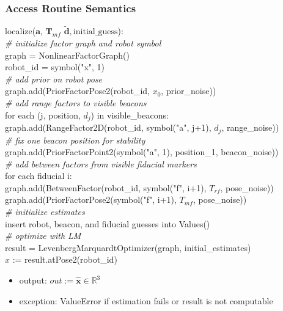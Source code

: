 \documentclass[12pt, titlepage]{article}
\begin{document}
\subsubsection{Access Routine Semantics}

\noindent localize($\mathbf{a}$, $\mathbf{T}_{mf}$ $\mathbf{\tilde{d}}, \mathrm{initial\_guess}$):\\

\noindent \textit{\# initialize factor graph and robot symbol}\\
graph = NonlinearFactorGraph()\\
robot\_id = symbol("x", 1)\\

\noindent \textit{\# add prior on robot pose}\\
graph.add(PriorFactorPose2(robot\_id, $x_0$, prior\_noise))\\

\noindent \textit{\# add range factors to visible beacons}\\
for each (j, position, $d_j$) in visible\_beacons:\\
    graph.add(RangeFactor2D(robot\_id, symbol("a", j+1), $d_j$, range\_noise))\\

\noindent \textit{\# fix one beacon position for stability}\\
graph.add(PriorFactorPoint2(symbol("a", 1), position\_1, beacon\_noise))\\

\noindent \textit{\# add between factors from visible fiducial markers}\\
for each fiducial i:\\
    graph.add(BetweenFactor(robot\_id, symbol("f", i+1), $T_{rf}$, pose\_noise))\\
    graph.add(PriorFactorPose2(symbol("f", i+1), $T_{mf}$, pose\_noise))\\

\noindent \textit{\# initialize estimates}\\
insert robot, beacon, and fiducial guesses into Values()\\

\noindent \textit{\# optimize with LM}\\
result = LevenbergMarquardtOptimizer(graph, initial\_estimates)\\
$\hat{x}$ := result.atPose2(robot\_id)



\begin{itemize}
\item output: $out:= \mathbf{\hat{x}} \in \mathbb{R}^3$
\item exception: ValueError if estimation fails or result is not computable
\end{itemize}
\end{document}
